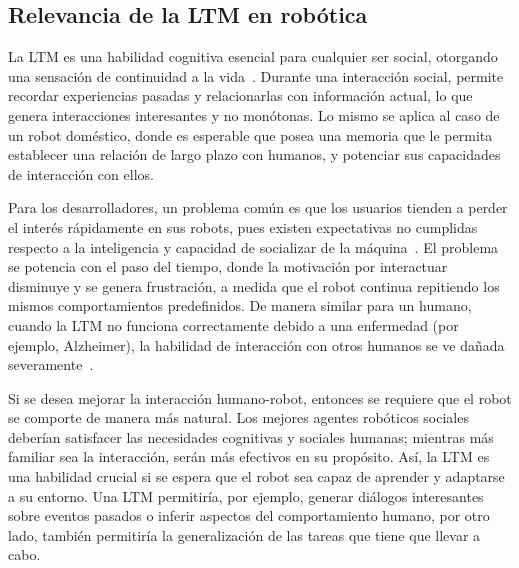 \subsection{Relevancia de la LTM en robótica}

La LTM es una habilidad cognitiva esencial para cualquier ser social, otorgando una sensación de continuidad a la vida~\cite{Vijayakumar2014}. Durante una interacción social, permite recordar experiencias pasadas y relacionarlas con información actual, lo que genera interacciones interesantes y no monótonas. Lo mismo se aplica al caso de un robot doméstico, donde es esperable que posea una memoria que le permita establecer una relación de largo plazo con humanos, y potenciar sus capacidades de interacción con ellos.

Para los desarrolladores, un problema común es que los usuarios tienden a perder el interés rápidamente en sus robots, pues existen expectativas no cumplidas respecto a la inteligencia y capacidad de socializar de la máquina~\cite{Ho2009}. El problema se potencia con el paso del tiempo, donde la motivación por interactuar disminuye y se genera frustración, a medida que el robot continua repitiendo los mismos comportamientos predefinidos. De manera similar para un humano, cuando la LTM no funciona correctamente debido a una enfermedad (por ejemplo, Alzheimer), la habilidad de interacción con otros humanos se ve dañada severamente~\cite{ltm_in_robocup}.

Si se desea mejorar la interacción humano-robot, entonces se requiere que el robot se comporte de manera más natural. Los mejores agentes robóticos sociales deberían satisfacer las necesidades cognitivas y sociales humanas; mientras más familiar sea la interacción, serán más efectivos en su propósito. Así, la LTM es una habilidad crucial si se espera que el robot sea capaz de aprender y adaptarse a su entorno. Una LTM permitiría, por ejemplo, generar diálogos interesantes sobre eventos pasados o inferir aspectos del comportamiento humano, por otro lado, también permitiría la generalización de las tareas que tiene que llevar a cabo.

